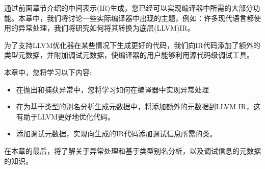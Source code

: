 通过前面章节介绍的中间表示(IR)生成，您已经可以实现编译器中所需的大部分功能。本章中，我们将讨论一些实际编译器中出现的主题，例如：许多现代语言都使用的异常处理，我们将研究如何将其转换为底层(LLVM)IR。\par

为了支持LLVM优化器在某些情况下生成更好的代码，我们向IR代码添加了额外的类型元数据，并附加调试元数据，使编译器的用户能够利用源代码级调试工具。\par

本章中，您将学习以下内容:\par

\begin{itemize}
	\item 在抛出和捕获异常中，您将学习如何在编译器中实现异常处理
	\item 在为基于类型的别名分析生成元数据中，将添加额外的元数据到LLVM IR，这有助于LLVM更好地优化代码。
	\item 添加调试元数据，实现向生成的IR代码添加调试信息所需的类。
\end{itemize}

在本章的最后，将了解关于异常处理和基于类型别名分析，以及调试信息的元数据的知识。\par






